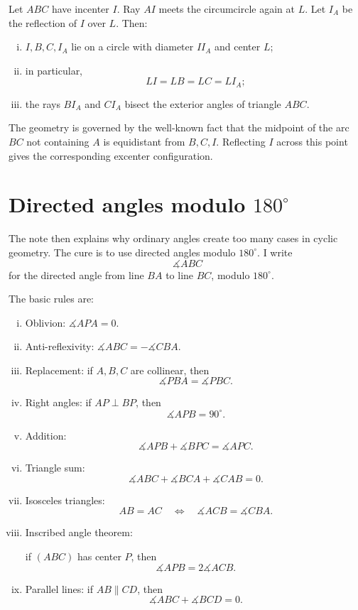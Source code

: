 Let \(ABC\) have incenter \(I\).  Ray \(AI\) meets the circumcircle again at \(L\).  Let \(I_A\) be the reflection of \(I\) over \(L\).  Then:
\begin{enumerate}[(i)]
  \item \(I,B,C,I_A\) lie on a circle with diameter \(II_A\) and center \(L\);
  \item in particular,
  \[
    LI=LB=LC=LI_A;
  \]
  \item the rays \(BI_A\) and \(CI_A\) bisect the exterior angles of triangle \(ABC\).
\end{enumerate}

The geometry is governed by the well-known fact that the midpoint of the arc \(BC\) not containing \(A\) is equidistant from \(B,C,I\).  Reflecting \(I\) across this point gives the corresponding excenter configuration.

\section[Directed angles modulo 180\textasciicircum{}circ]{Directed angles modulo \(180^\circ\)}

The note then explains why ordinary angles create too many cases in cyclic geometry.  The cure is to use directed angles modulo \(180^\circ\).  I write
\[
  \measuredangle ABC
\]
for the directed angle from line \(BA\) to line \(BC\), modulo \(180^\circ\).

The basic rules are:
\begin{enumerate}[(i)]
  \item Oblivion: \(\measuredangle APA=0\).
  \item Anti-reflexivity: \(\measuredangle ABC=-\measuredangle CBA\).
  \item Replacement: if \(A,B,C\) are collinear, then
  \[
    \measuredangle PBA=\measuredangle PBC.
  \]
  \item Right angles: if \(AP\perp BP\), then
  \[
    \measuredangle APB=90^\circ.
  \]
  \item Addition:
  \[
    \measuredangle APB+\measuredangle BPC=\measuredangle APC.
  \]
  \item Triangle sum:
  \[
    \measuredangle ABC+\measuredangle BCA+\measuredangle CAB=0.
  \]
  \item Isosceles triangles:
  \[
    AB=AC\quad\Longleftrightarrow\quad
    \measuredangle ACB=\measuredangle CBA.
  \]
  \item Inscribed angle theorem:
  
  if \((ABC)\) has center \(P\), then
  \[
    \measuredangle APB=2\measuredangle ACB.
  \]
  \item Parallel lines:
  if \(AB\parallel CD\), then
  \[
    \measuredangle ABC+\measuredangle BCD=0.
  \]
\end{enumerate}

